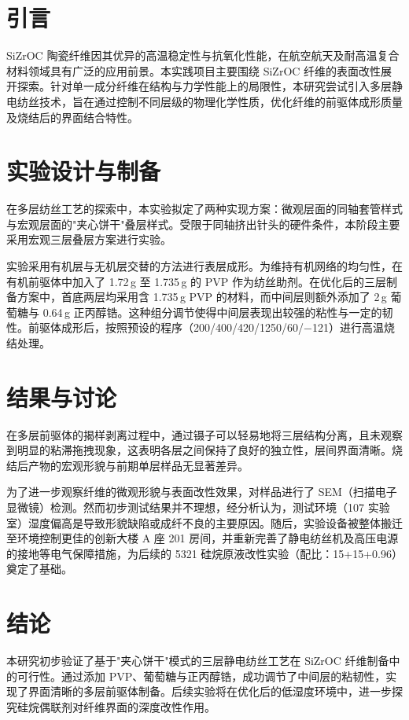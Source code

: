 \section{引言}
SiZrOC 陶瓷纤维因其优异的高温稳定性与抗氧化性能，在航空航天及耐高温复合材料领域具有广泛的应用前景。本实践项目主要围绕 SiZrOC 纤维的表面改性展开探索。针对单一成分纤维在结构与力学性能上的局限性，本研究尝试引入多层静电纺丝技术，旨在通过控制不同层级的物理化学性质，优化纤维的前驱体成形质量及烧结后的界面结合特性。

\section{实验设计与制备}
在多层纺丝工艺的探索中，本实验拟定了两种实现方案：微观层面的同轴套管样式与宏观层面的"夹心饼干"叠层样式。受限于同轴挤出针头的硬件条件，本阶段主要采用宏观三层叠层方案进行实验。

实验采用有机层与无机层交替的方法进行表层成形。为维持有机网络的均匀性，在有机前驱体中加入了 1.72\,g 至 1.735\,g 的 PVP 作为纺丝助剂。在优化后的三层制备方案中，首底两层均采用含 1.735\,g PVP 的材料，而中间层则额外添加了 2\,g 葡萄糖与 0.64\,g 正丙醇锆。这种组分调节使得中间层表现出较强的粘性与一定的韧性。前驱体成形后，按照预设的程序（200/400/420/1250/60/−121）进行高温烧结处理。

\section{结果与讨论}
在多层前驱体的揭样剥离过程中，通过镊子可以轻易地将三层结构分离，且未观察到明显的粘滞拖拽现象，这表明各层之间保持了良好的独立性，层间界面清晰。烧结后产物的宏观形貌与前期单层样品无显著差异。

为了进一步观察纤维的微观形貌与表面改性效果，对样品进行了 SEM（扫描电子显微镜）检测。然而初步测试结果并不理想，经分析认为，测试环境（107 实验室）湿度偏高是导致形貌缺陷或成纤不良的主要原因。随后，实验设备被整体搬迁至环境控制更佳的创新大楼 A 座 201 房间，并重新完善了静电纺丝机及高压电源的接地等电气保障措施，为后续的 5321 硅烷原液改性实验（配比：15+15+0.96）奠定了基础。

\section{结论}
本研究初步验证了基于"夹心饼干"模式的三层静电纺丝工艺在 SiZrOC 纤维制备中的可行性。通过添加 PVP、葡萄糖与正丙醇锆，成功调节了中间层的粘韧性，实现了界面清晰的多层前驱体制备。后续实验将在优化后的低湿度环境中，进一步探究硅烷偶联剂对纤维界面的深度改性作用。
